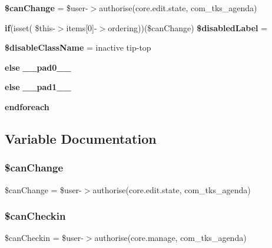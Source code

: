 \begin{DoxyCompactItemize}
\item 
\textbf{ \$can\+Change} = \$user-\/$>$authorise(\textquotesingle{}core.\+edit.\+state\textquotesingle{}, \textquotesingle{}com\+\_\+tks\+\_\+agenda\textquotesingle{})
\item 
\textbf{ if}(isset( \$this-\/$>$items[0]-\/$>$ordering))(\$can\+Change) \textbf{ \$disabled\+Label} = \textquotesingle{}\textquotesingle{}
\item 
\textbf{ \$disable\+Class\+Name} = \textquotesingle{}inactive tip-\/top\textquotesingle{}
\item 
\textbf{ else} \textbf{ \+\_\+\+\_\+pad0\+\_\+\+\_\+}
\item 
\textbf{ else} \textbf{ \+\_\+\+\_\+pad1\+\_\+\+\_\+}
\item 
\textbf{ endforeach}
\end{DoxyCompactItemize}


\subsection{Variable Documentation}
\mbox{\label{administrator_2views_2newsitems_2tmpl_2default_8php_a5baed5c5102e35aea5e62f18b474dc3f}} 
\subsubsection{\$can\+Change}
{\footnotesize\ttfamily \$can\+Change = \$user-\/$>$authorise(\textquotesingle{}core.\+edit.\+state\textquotesingle{}, \textquotesingle{}com\+\_\+tks\+\_\+agenda\textquotesingle{})}

\mbox{\label{administrator_2views_2newsitems_2tmpl_2default_8php_ad261c913946b4e234d7ed6a972e27823}} 
\subsubsection{\$can\+Checkin}
{\footnotesize\ttfamily \$can\+Checkin = \$user-\/$>$authorise(\textquotesingle{}core.\+manage\textquotesingle{}, \textquotesingle{}com\+\_\+tks\+\_\+agenda\textquotesingle{})}

